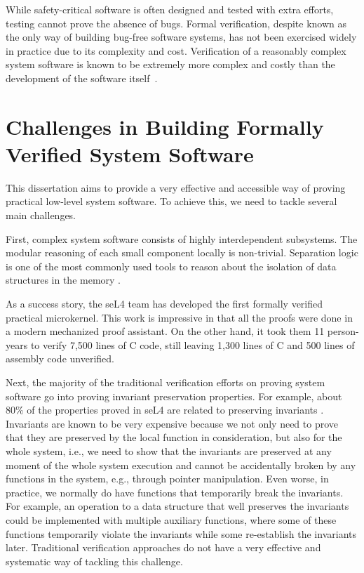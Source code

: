 While safety-critical software is often designed and tested with extra efforts, testing cannot
prove the absence of bugs. Formal verification, despite known as the only way of building
bug-free software systems, has not been exercised widely in practice due to its complexity and cost.
Verification of a reasonably complex system software is known to be extremely more complex and
costly than the development of the software itself~\cite{klein2009sel4,klein14}.


\section{Challenges in Building Formally Verified System Software}

This dissertation aims to provide a very effective and accessible way of proving practical low-level
system software. To achieve this, we need to tackle several main challenges.

First, complex system software consists of highly interdependent subsystems.
The modular reasoning of each small component locally is non-trivial.
Separation logic is one of the most commonly
used tools to reason about the isolation of data structures in the memory
\cite{appel07:tphols,Tuch:2009}. 
As a success story,
the seL4 team \cite{klein2009sel4} has developed the first
formally verified practical microkernel.
This work is impressive in that all the proofs were done
in a modern mechanized proof assistant.
On the other hand, it took them 11 person-years to verify 7,500 lines of
C code, still leaving 1,300 lines of C and 500 lines of assembly code
unverified.


Next, the majority of the traditional verification efforts on proving system software go into proving invariant preservation properties.
For example, about 80\% of the properties proved in seL4 are related
to preserving invariants \cite{klein14}. 
Invariants are known to be very expensive
because we not only need to prove that they are preserved by the local function in consideration,
but also for the whole system, i.e., we need to show that the invariants are preserved at any
moment of the whole system execution and cannot be accidentally broken by any functions
in the system, e.g., through pointer manipulation. Even worse, in practice, we normally do
have functions that temporarily break the invariants. For example, an operation to a data structure
that well preserves the invariants could be implemented with multiple auxiliary functions, where
some of these functions temporarily violate the invariants while some re-establish
the invariants later. Traditional verification approaches
do not have a very effective and systematic way of tackling this challenge.

